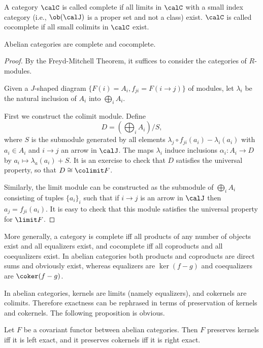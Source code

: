 \begin{defn}
    A category $\calC$ is called complete if all limits in $\calC$ with a small index category (i.e., $\ob(\calJ)$ is a proper set and not a class) exist. $\calC$ is called cocomplete if all small colimits in $\calC$ exist.
\end{defn}

\begin{prop}\label{prop abelian complete and cocomplete}
    Abelian categories are complete and cocomplete.
\end{prop}
\begin{proof}
    By the Freyd-Mitchell Theorem, it suffices to consider the categories of $R$-modules. 
    
    Given a $J$-shaped diagram $\{F(i)=A_i,f_{ji}=F(i\to j)\}$ of modules, let $\lambda_i$ be the natural inclusion of $A_i$ into $\bigoplus_i A_i$. 
    
    First we construct the colimit module. Define
    \[D=\left(\bigoplus_i A_i\right)\slash S,\]
    where $S$ is the submodule generated by all elements $\lambda_j\circ f_{ji}(a_i)-\lambda_i(a_i)$ with $a_i\in A_i$ and $i\to j$ an arrow in $\calJ$. The maps $\lambda_i$ induce inclusions $\alpha_i: A_i\to D$ by $a_i\mapsto \lambda_a(a_i)+S$. It is an exercise to check that $D$ satisfies the universal property, so that $D\cong \colimit F$.

    Similarly, the limit module can be constructed as the submodule of $\bigoplus_i A_i$ consisting of tuples $\{a_i\}_{i}$ such that if $i\to j$ is an arrow in $\calJ$ then $a_j=f_{ji}(a_i)$. It is easy to check that this module satisfies the universal property for $\limit F$.
\end{proof}
\begin{rem}
    More generally, a category is complete iff all products of any number of objects exist and all equalizers exist, and cocomplete iff all coproducts and all coequalizers exist. In abelian categories both products and coproducts are direct sums and obviously exist, whereas equalizers are $\ker(f-g)$ and coequalizers are $\coker(f-g)$.
\end{rem}

In abelian categories, kernels are limits (namely equalizers), and cokernels are colimits. Therefore exactness can be rephrased in terms of preservation of kernels and cokernels. The following proposition is obvious.

\begin{prop}
    Let $F$ be a covariant functor between abelian categories. Then $F$ preserves kernels iff it is left exact, and it preserves cokernels iff it is right exact.
\end{prop}

